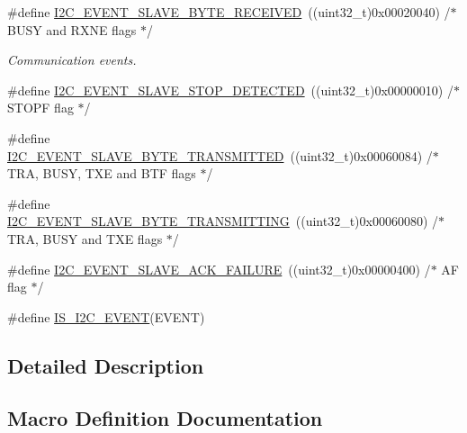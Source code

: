 \begin{DoxyCompactItemize}
\item 
\#define \mbox{\hyperlink{group___i2_c___events_ga8b244626839940569c6c8bbfc4efe21d}{I2\+C\+\_\+\+E\+V\+E\+N\+T\+\_\+\+S\+L\+A\+V\+E\+\_\+\+B\+Y\+T\+E\+\_\+\+R\+E\+C\+E\+I\+V\+ED}}~((uint32\+\_\+t)0x00020040)  /$\ast$ B\+U\+S\+Y and R\+X\+N\+E flags $\ast$/
\begin{DoxyCompactList}\small\item\em Communication events. \end{DoxyCompactList}\item 
\#define \mbox{\hyperlink{group___i2_c___events_ga3148d8d7087e418959bc31e2646b2941}{I2\+C\+\_\+\+E\+V\+E\+N\+T\+\_\+\+S\+L\+A\+V\+E\+\_\+\+S\+T\+O\+P\+\_\+\+D\+E\+T\+E\+C\+T\+ED}}~((uint32\+\_\+t)0x00000010)  /$\ast$ S\+T\+O\+P\+F flag $\ast$/
\item 
\#define \mbox{\hyperlink{group___i2_c___events_ga50652880323b8c2746b5afbdfea03fe1}{I2\+C\+\_\+\+E\+V\+E\+N\+T\+\_\+\+S\+L\+A\+V\+E\+\_\+\+B\+Y\+T\+E\+\_\+\+T\+R\+A\+N\+S\+M\+I\+T\+T\+ED}}~((uint32\+\_\+t)0x00060084)  /$\ast$ T\+R\+A, B\+U\+S\+Y, T\+X\+E and B\+T\+F flags $\ast$/
\item 
\#define \mbox{\hyperlink{group___i2_c___events_gaa574c93a99497649f3d8e7ff53796231}{I2\+C\+\_\+\+E\+V\+E\+N\+T\+\_\+\+S\+L\+A\+V\+E\+\_\+\+B\+Y\+T\+E\+\_\+\+T\+R\+A\+N\+S\+M\+I\+T\+T\+I\+NG}}~((uint32\+\_\+t)0x00060080)  /$\ast$ T\+R\+A, B\+U\+S\+Y and T\+X\+E flags $\ast$/
\item 
\#define \mbox{\hyperlink{group___i2_c___events_ga249bd611f1ca64653c0bfc606c591088}{I2\+C\+\_\+\+E\+V\+E\+N\+T\+\_\+\+S\+L\+A\+V\+E\+\_\+\+A\+C\+K\+\_\+\+F\+A\+I\+L\+U\+RE}}~((uint32\+\_\+t)0x00000400)  /$\ast$ A\+F flag $\ast$/
\item 
\#define \mbox{\hyperlink{group___i2_c___events_ga4b42e6936006195f89ff4f763d366970}{I\+S\+\_\+\+I2\+C\+\_\+\+E\+V\+E\+NT}}(E\+V\+E\+NT)
\end{DoxyCompactItemize}


\subsection{Detailed Description}


\subsection{Macro Definition Documentation}
\mbox{\label{group___i2_c___events_ga6bcf2ae49961e07e27cf9fdf334719e3}} 
